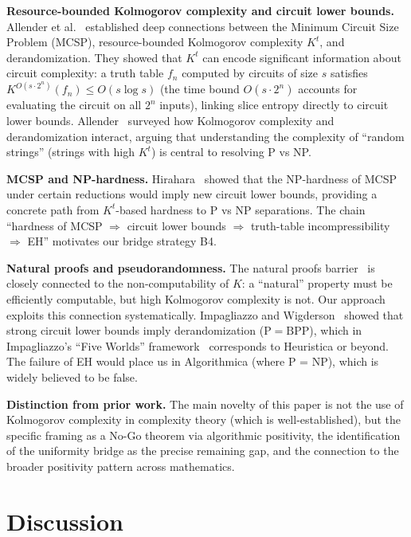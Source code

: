 \documentclass[aps,prd,twocolumn,superscriptaddress,nofootinbib]{revtex4-2}
\theoremstyle{definition}
\theoremstyle{remark}
\begin{document}
\textbf{Resource-bounded Kolmogorov complexity and circuit lower bounds.}
Allender et al.~\cite{Allender2006} established deep connections between the Minimum Circuit Size Problem (MCSP), resource-bounded Kolmogorov complexity $K^t$, and derandomization. They showed that $K^t$ can encode significant information about circuit complexity: a truth table $f_n$ computed by circuits of size $s$ satisfies $K^{O(s \cdot 2^n)}(f_n) \leq O(s \log s)$ (the time bound $O(s \cdot 2^n)$ accounts for evaluating the circuit on all $2^n$ inputs), linking slice entropy directly to circuit lower bounds. Allender~\cite{Allender2001} surveyed how Kolmogorov complexity and derandomization interact, arguing that understanding the complexity of ``random strings'' (strings with high $K^t$) is central to resolving P vs NP.

\textbf{MCSP and NP-hardness.}
Hirahara~\cite{Hirahara2018} showed that the NP-hardness of MCSP under certain reductions would imply new circuit lower bounds, providing a concrete path from $K^t$-based hardness to P vs NP separations. The chain ``hardness of MCSP $\Rightarrow$ circuit lower bounds $\Rightarrow$ truth-table incompressibility $\Rightarrow$ EH'' motivates our bridge strategy B4.

\textbf{Natural proofs and pseudorandomness.}
The natural proofs barrier~\cite{RazborovRudich1997} is closely connected to the non-computability of $K$: a ``natural'' property must be efficiently computable, but high Kolmogorov complexity is not. Our approach exploits this connection systematically. Impagliazzo and Wigderson~\cite{ImpagliazzoWigderson1997} showed that strong circuit lower bounds imply derandomization ($\mathrm{P} = \mathrm{BPP}$), which in Impagliazzo's ``Five Worlds'' framework~\cite{Impagliazzo1995} corresponds to Heuristica or beyond. The failure of EH would place us in Algorithmica (where P = NP), which is widely believed to be false.

\textbf{Distinction from prior work.}
The main novelty of this paper is not the use of Kolmogorov complexity in complexity theory (which is well-established), but the specific framing as a No-Go theorem via algorithmic positivity, the identification of the uniformity bridge as the precise remaining gap, and the connection to the broader positivity pattern across mathematics.

\section{Discussion}
\label{sec:discussion}
\end{document}
